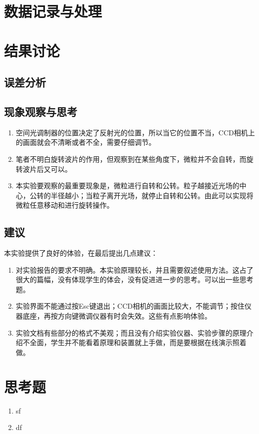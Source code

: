 \documentclass[UTF8,12pt,a4paper]{article}
\begin{document}
\section{数据记录与处理}

\section{结果讨论}
\subsection{误差分析}
\subsection{现象观察与思考}
\begin{enumerate}
	\item 空间光调制器的位置决定了反射光的位置，所以当它的位置不当，CCD相机上的画面就会不清晰或者不全，需要仔细调节。
	\item 笔者不明白旋转波片的作用，但观察到在某些角度下，微粒并不会自转，而旋转波片后又可以。
	\item 本实验要观察的最重要现象是，微粒进行自转和公转。粒子越接近光场的中心，公转的半径越小；当粒子离开光场，就停止自转和公转。由此可以实现将微粒任意移动和进行旋转操作。
\end{enumerate}

\subsection{建议}
本实验提供了良好的体验，在最后提出几点建议：
\begin{enumerate}
	\item 对实验报告的要求不明确。本实验原理较长，并且需要叙述使用方法。这占了很大的篇幅，没有体现学生的体会，没有促进进一步的思考。可以出一些思考题。
	\item 实验界面不能通过按Esc键退出；CCD相机的画面比较大，不能调节；按住仪器底座，再按方向键微调仪器有时会失效。这些有点影响体验。
	\item 实验文档有些部分的格式不美观；而且没有介绍实验仪器、实验步骤的原理介绍不全面，学生并不能看着原理和装置就上手做，而是要根据在线演示照着做。
\end{enumerate}

\section{思考题}
\begin{enumerate}
	\item sf
	\item df
\end{enumerate}
\end{document}
